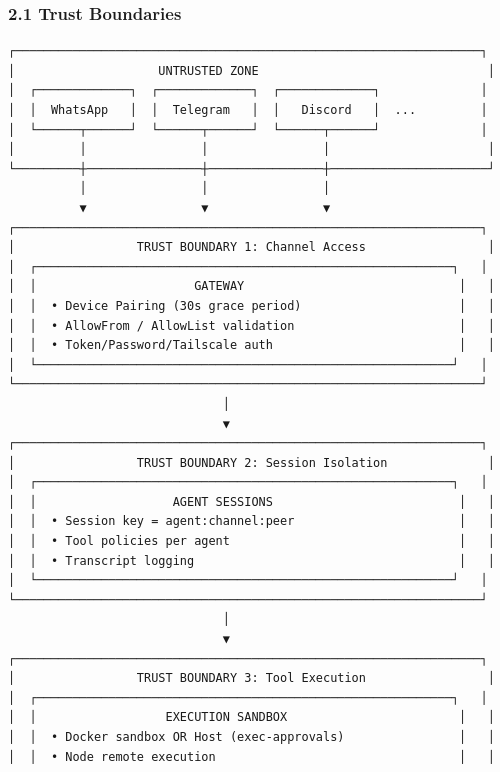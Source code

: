 \subsubsection{2.1 Trust Boundaries}


\begin{lstlisting}
┌─────────────────────────────────────────────────────────────────┐
│                    UNTRUSTED ZONE                                │
│  ┌─────────────┐  ┌─────────────┐  ┌─────────────┐              │
│  │  WhatsApp   │  │  Telegram   │  │   Discord   │  ...         │
│  └──────┬──────┘  └──────┬──────┘  └──────┬──────┘              │
│         │                │                │                      │
└─────────┼────────────────┼────────────────┼──────────────────────┘
          │                │                │
          ▼                ▼                ▼
┌─────────────────────────────────────────────────────────────────┐
│                 TRUST BOUNDARY 1: Channel Access                 │
│  ┌──────────────────────────────────────────────────────────┐   │
│  │                      GATEWAY                              │   │
│  │  • Device Pairing (30s grace period)                      │   │
│  │  • AllowFrom / AllowList validation                       │   │
│  │  • Token/Password/Tailscale auth                          │   │
│  └──────────────────────────────────────────────────────────┘   │
└─────────────────────────────────────────────────────────────────┘
                              │
                              ▼
┌─────────────────────────────────────────────────────────────────┐
│                 TRUST BOUNDARY 2: Session Isolation              │
│  ┌──────────────────────────────────────────────────────────┐   │
│  │                   AGENT SESSIONS                          │   │
│  │  • Session key = agent:channel:peer                       │   │
│  │  • Tool policies per agent                                │   │
│  │  • Transcript logging                                     │   │
│  └──────────────────────────────────────────────────────────┘   │
└─────────────────────────────────────────────────────────────────┘
                              │
                              ▼
┌─────────────────────────────────────────────────────────────────┐
│                 TRUST BOUNDARY 3: Tool Execution                 │
│  ┌──────────────────────────────────────────────────────────┐   │
│  │                  EXECUTION SANDBOX                        │   │
│  │  • Docker sandbox OR Host (exec-approvals)                │   │
│  │  • Node remote execution                                  │   │

\end{lstlisting}
